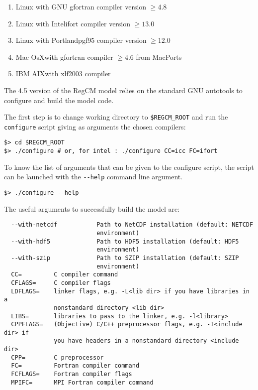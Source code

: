 \begin{enumerate}
\item Linux with GNU gfortran compiler version $\ge 4.8$
\item Linux with Intel\texttrademark ifort compiler version $\ge 13.0$
\item Linux with Portland\texttrademark pgf95 compiler version $\ge 12.0$
\item Mac OsX\texttrademark with gfortran compiler $\ge 4.6$ from MacPorts
\item IBM AIX\texttrademark with xlf2003 compiler
\end{enumerate}

The 4.5 version of the RegCM model relies on the standard GNU autotools to
configure and build the model code.

The first step is to change working directory to \verb=$REGCM_ROOT= and run the
\verb=configure= script giving as arguments the chosen compilers:

\begin{Verbatim}
$> cd $REGCM_ROOT
$> ./configure # or, for intel : ./configure CC=icc FC=ifort
\end{Verbatim}

To know the list of arguments that can be given to the configure script, the
script can be launched with the \verb=--help= command line argument.

\begin{Verbatim}
$> ./configure --help
\end{Verbatim}

The useful arguments to successfully build the model are:

\begin{Verbatim}
  --with-netcdf           Path to NetCDF installation (default: NETCDF
                          environment)
  --with-hdf5             Path to HDF5 installation (default: HDF5
                          environment)
  --with-szip             Path to SZIP installation (default: SZIP
                          environment)
  CC=         C compiler command
  CFLAGS=     C compiler flags
  LDFLAGS=    linker flags, e.g. -L<lib dir> if you have libraries in a
              nonstandard directory <lib dir>
  LIBS=       libraries to pass to the linker, e.g. -l<library>
  CPPFLAGS=   (Objective) C/C++ preprocessor flags, e.g. -I<include dir> if
              you have headers in a nonstandard directory <include dir>
  CPP=        C preprocessor
  FC=         Fortran compiler command
  FCFLAGS=    Fortran compiler flags
  MPIFC=      MPI Fortran compiler command
\end{Verbatim}

